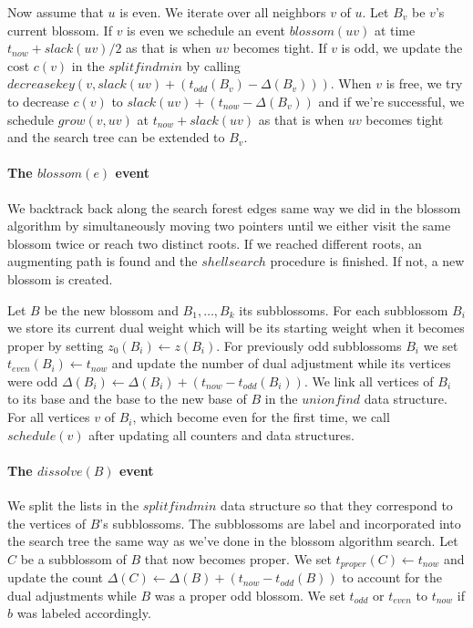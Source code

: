 Now assume that $u$ is even. We iterate over all neighbors $v$ of $u$. Let $B_v$ be $v$'s current blossom. If $v$ is even we schedule an event $blossom(uv)$ at time $t_{now} + slack(uv)/2$ as that is when $uv$ becomes tight. If $v$ is odd, we update the cost $c(v)$ in the $splitfindmin$ by calling $decreasekey(v, slack(uv) + (t_{odd}(B_v) - \Delta(B_v)))$. When $v$ is free, we try to decrease $c(v)$ to $slack(uv) + (t_{now} - \Delta(B_v))$ and if we're successful, we schedule $grow(v, uv)$ at $t_{now} + slack(uv)$ as that is when $uv$ becomes tight and the search tree can be extended to $B_v$.

\paragraph*{The $blossom(e)$ event}

We backtrack back along the search forest edges same way we did in the blossom algorithm by simultaneously moving two pointers until we either visit the same blossom twice or reach two distinct roots. If we reached different roots, an augmenting path is found and the $shellsearch$ procedure is finished. If not, a new blossom is created. 

Let $B$ be the new blossom and $B_1, \dots, B_k$ its subblossoms.
For each subblossom $B_i$ we store its current dual weight which will be its starting weight when it becomes proper by setting $z_0(B_i) \gets z(B_i)$. For previously odd subblossoms $B_i$ we set $t_{even}(B_i) \gets t_{now}$ and update the number of dual adjustment while its vertices were odd $\Delta(B_i) \gets \Delta(B_i) + (t_{now} - t_{odd}(B_i))$. We link all vertices of $B_i$ to its base and the base to the new base of $B$ in the $unionfind$ data structure. For all vertices $v$ of $B_i$, which become even for the first time, we call $schedule(v)$ after updating all counters and data structures.

\paragraph*{The $dissolve(B)$ event} 

We split the lists in the $splitfindmin$ data structure so that they correspond to the vertices of $B$'s subblossoms. The subblossoms are label and incorporated into the search tree the same way as we've done in the blossom algorithm search. Let $C$ be a subblossom of $B$ that now becomes proper. We set $t_{proper}(C) \gets t_{now}$ and update the count $\Delta(C) \gets \Delta(B) + (t_{now} - t_{odd}(B))$ to account for the dual adjustments while $B$ was a proper odd blossom. We set $t_{odd}$ or $t_{even}$ to $t_{now}$ if $b$ was labeled accordingly. 

